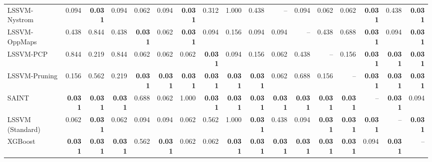\begin{table}[ht]
{\begin{tabular}{lrrrrrrrrrrrrrrrr}
LSSVM-Nystrom & 0.094 & \textbf{0.031} & 0.094 & 0.062 & 0.094 & \textbf{0.031} & 0.312 & 1.000 & 0.438 & -- & 0.094 & 0.062 & 0.062 & \textbf{0.031} & 0.438 & \textbf{0.031} \\
LSSVM-OppMaps & 0.438 & 0.844 & 0.438 & \textbf{0.031} & 0.062 & \textbf{0.031} & 0.094 & 0.156 & 0.094 & 0.094 & -- & 0.438 & 0.688 & \textbf{0.031} & 0.094 & \textbf{0.031} \\
LSSVM-PCP & 0.844 & 0.219 & 0.844 & 0.062 & 0.062 & 0.062 & \textbf{0.031} & 0.094 & 0.156 & 0.062 & 0.438 & -- & 0.156 & \textbf{0.031} & \textbf{0.031} & \textbf{0.031} \\
LSSVM-Pruning & 0.156 & 0.562 & 0.219 & \textbf{0.031} & \textbf{0.031} & \textbf{0.031} & \textbf{0.031} & \textbf{0.031} & \textbf{0.031} & 0.062 & 0.688 & 0.156 & -- & \textbf{0.031} & \textbf{0.031} & \textbf{0.031} \\
SAINT & \textbf{0.031} & \textbf{0.031} & \textbf{0.031} & 0.688 & 0.062 & 1.000 & \textbf{0.031} & \textbf{0.031} & \textbf{0.031} & \textbf{0.031} & \textbf{0.031} & \textbf{0.031} & \textbf{0.031} & -- & \textbf{0.031} & 0.094 \\
LSSVM (Standard) & 0.062 & \textbf{0.031} & 0.062 & 0.094 & 0.094 & 0.062 & 0.562 & 1.000 & \textbf{0.031} & 0.438 & 0.094 & \textbf{0.031} & \textbf{0.031} & \textbf{0.031} & -- & \textbf{0.031} \\
XGBoost & \textbf{0.031} & \textbf{0.031} & \textbf{0.031} & 0.562 & \textbf{0.031} & 0.062 & 0.062 & \textbf{0.031} & \textbf{0.031} & \textbf{0.031} & \textbf{0.031} & \textbf{0.031} & \textbf{0.031} & 0.094 & \textbf{0.031} & -- \\
    \bottomrule
  \end{tabular}}
\end{table}